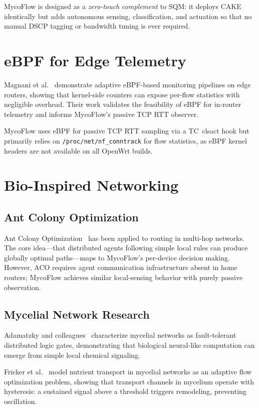 MycoFlow is designed as a \emph{zero-touch complement} to SQM: it deploys CAKE identically but adds autonomous sensing, classification, and actuation so that no manual DSCP tagging or bandwidth tuning is ever required.

\section{eBPF for Edge Telemetry}

Magnani et al.~\cite{magnani2022} demonstrate adaptive eBPF-based monitoring pipelines on edge routers, showing that kernel-side counters can expose per-flow statistics with negligible overhead. Their work validates the feasibility of eBPF for in-router telemetry and informs MycoFlow's passive TCP RTT observer.

MycoFlow uses eBPF for passive TCP RTT sampling via a TC~clsact hook but primarily relies on \texttt{/proc/net/nf\_conntrack} for flow statistics, as eBPF kernel headers are not available on all OpenWrt builds.

\section{Bio-Inspired Networking}

\subsection{Ant Colony Optimization}

Ant Colony Optimization~\cite{dorigo1996ant} has been applied to routing in multi-hop networks. The core idea---that distributed agents following simple local rules can produce globally optimal paths---maps to MycoFlow's per-device decision making. However, ACO requires agent communication infrastructure absent in home routers; MycoFlow achieves similar local-sensing behavior with purely passive observation.

\subsection{Mycelial Network Research}

Adamatzky and colleagues~\cite{adamatzky2022logics} characterize mycelial networks as fault-tolerant distributed logic gates, demonstrating that biological neural-like computation can emerge from simple local chemical signaling.

Fricker et al.~\cite{fricker2017mycelium} model nutrient transport in mycelial networks as an adaptive flow optimization problem, showing that transport channels in mycelium operate with hysteresis: a sustained signal above a threshold triggers remodeling, preventing oscillation.

